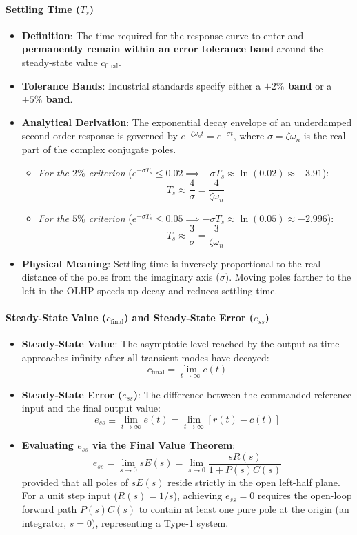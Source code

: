 \documentclass[12pt,onecolumn,twoside ]{article}
\begin{document}
	\paragraph{Settling Time ($T_s$)}
	\begin{itemize}
		\item
		\textbf{Definition}: The time required for the response curve to enter and \textbf{permanently remain within an error tolerance band} around the steady-state value $c_{\text{final}}$.
		\item
		\textbf{Tolerance Bands}: Industrial standards specify either a \textbf{$\pm 2\%$ band} or a \textbf{$\pm 5\%$ band}.
		\item
		\textbf{Analytical Derivation}: The exponential decay envelope of an underdamped second-order response is governed by $e^{-\zeta \omega_n t} = e^{-\sigma t}$, where $\sigma = \zeta \omega_n$ is the real part of the complex conjugate poles.
		\begin{itemize}
			\item
			\textit{For the $2\%$ criterion} ($e^{-\sigma T_s} \le 0.02 \implies -\sigma T_s \approx \ln(0.02) \approx -3.91$): \[
			T_s \approx \frac{4}{\sigma} = \frac{4}{\zeta \omega_n}
			\]
			\item
			\textit{For the $5\%$ criterion} ($e^{-\sigma T_s} \le 0.05 \implies -\sigma T_s \approx \ln(0.05) \approx -2.996$): \[
			T_s \approx \frac{3}{\sigma} = \frac{3}{\zeta \omega_n}
			\]
		\end{itemize}
		\item
		\textbf{Physical Meaning}: Settling time is inversely proportional to the real distance of the poles from the imaginary axis ($\sigma$). Moving poles farther to the left in the OLHP speeds up decay and reduces settling time.
	\end{itemize}
	\paragraph{Steady-State Value ($c_{\text{final}}$) and Steady-State Error ($e_{ss}$)}
	\begin{itemize}
		\item
		\textbf{Steady-State Value}: The asymptotic level reached by the output as time approaches infinity after all transient modes have decayed: \[
		c_{\text{final}} = \lim_{t \to \infty} c(t)
		\]
		\item
		\textbf{Steady-State Error ($e_{ss}$)}: The difference between the commanded reference input and the final output value: \[
		e_{ss} \equiv \lim_{t \to \infty} e(t) = \lim_{t \to \infty} [r(t) - c(t)]
		\]
		\item
		\textbf{Evaluating $e_{ss}$ via the Final Value Theorem}: \[
		e_{ss} = \lim_{s \to 0} s E(s) = \lim_{s \to 0} \frac{s R(s)}{1 + P(s)C(s)}
		\] provided that all poles of $sE(s)$ reside strictly in the open left-half plane. For a unit step input ($R(s) = 1/s$), achieving $e_{ss} = 0$ requires the open-loop forward path $P(s)C(s)$ to contain at least one pure pole at the origin (an integrator, $s=0$), representing a Type-1 system.
	\end{itemize}
	
\end{document}
